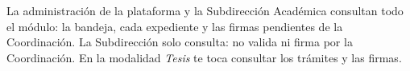 \documentclass[11pt,a4paper]{article}
\begin{document}
{\small\tableofcontents}
\newpage
\begin{quevasahacer}
La administración de la plataforma y la Subdirección Académica consultan todo el módulo: la bandeja, cada expediente y las firmas pendientes de la Coordinación. La Subdirección solo consulta: no valida ni firma por la Coordinación. En la modalidad \emph{Tesis} te toca consultar los trámites y las firmas.
\end{quevasahacer}




\end{document}

